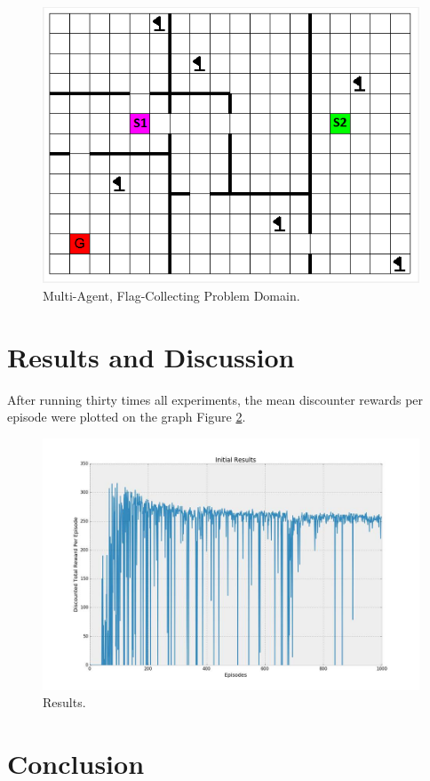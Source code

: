 \documentclass[letterpaper]{article}
\begin{document}
\begin{figure}[h!]
  \includegraphics[width=\linewidth]{img/studycase.png}
  \caption{Multi-Agent, Flag-Collecting Problem Domain.}
  \label{fig:studycase1}
\end{figure}




\section{Results and Discussion}

After running thirty times all experiments, the mean discounter rewards per episode were plotted on the graph Figure \ref{fig:results1}. \\

\begin{figure}[h!]
  \includegraphics[width=\linewidth]{img/mean.jpg}
  \caption{Results.}
  \label{fig:results1}
\end{figure}


\section{Conclusion}




\footnotesize


\end{document}
